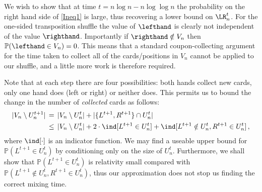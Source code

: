 \documentclass[11pt]{report}
\begin{document}
We wish to show that at time $t=n\log n - n\log\log n$ the probability on 
the 
right hand side of \eqref{Ineq1} is large, thus recovering a lower bound on 
$\LR_{n}^{t}$. For the one-sided transposition shuffle the value of $\lefthand$ is clearly not independent of the value $\righthand$. Importantly if $\righthand \notin V_{n}$ then $\mathbb{P}(\lefthand \in V_{n}) =0$.   This means that a standard 
coupon-collecting argument for the time taken to collect all of the 
cards/positions in $V_n$ cannot be applied to our shuffle, and a little 
more work is therefore required.

Note that at each step there are four possibilities: both hands collect new 
cards, only one hand does (left or right) or neither does. This permits us 
to bound the change in the number of \emph{collected} cards as follows:
\begin{align}
|V_n\setminus U_n^{t+1}| & \,=\, |V_n\setminus U_n^{t}| + 
|\{L^{t+1},R^{t+1}\}\cap U_n^t| \nonumber \\
& \,\le\, |V_n\setminus U_n^{t}| + 2 \cdot \ind [L^{t+1}\in U_n^t] + 
\ind[L^{t+1}\notin U_n^t,R^{t+1}\in 
U_n^t]\,,\label{eqn:indicator_fns} 
\end{align}
where $\ind[\cdot]$ is an 
indicator function. We may find a useable 
upper bound for $\mathbb{P}(L^{t+1}\in U_n^t)$ by conditioning only on the size of $U_{n}^{t}$. Furthermore, we shall show that $\mathbb{P}(L^{t+1}\in U_n^t)$ is relativity small compared with $\mathbb{P}(L^{t+1}\notin U_n^t,R^{t+1}\in 
U_n^t)$, thus our approximation does not stop us finding the correct mixing time.
\end{document}
